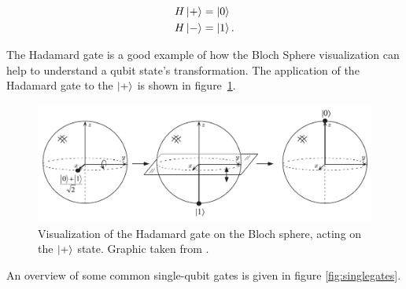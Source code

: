 \begin{align}
  H \Ket{+} &= \Ket{0} \\
  H \Ket{-} &= \Ket{1}.
\end{align}

The Hadamard gate is a good example of how the Bloch Sphere visualization can help to understand a qubit state's transformation. The application of the Hadamard gate to the $\Ket{+}$ is shown in figure~\ref{fig:blochH}.

\begin{figure}[H]
  \centering
  \includegraphics[width=\textwidth]{figures/hadamard}
  \caption[Hadamard Visualization]{Visualization of the Hadamard gate on the Bloch sphere, acting on the $\Ket{+}$ state. Graphic taken from \cite{nielsen2002quantum}.}
  \label{fig:blochH}
\end{figure}

An overview of some common single-qubit gates is given in figure \ref{fig:singlegates}.

